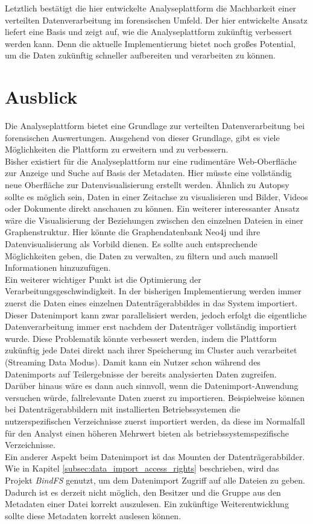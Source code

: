 \noindent
Letztlich bestätigt die hier entwickelte Analyseplattform die Machbarkeit einer verteilten Datenverarbeitung im forensischen Umfeld. Der hier entwickelte Ansatz liefert eine Basis und zeigt auf, wie die Analyseplattform zukünftig verbessert werden kann. Denn die aktuelle Implementierung bietet noch großes Potential, um die Daten zukünftig schneller aufbereiten und verarbeiten zu können.\\

\chapter{Ausblick}
\label{ch:ausblick}

Die Analyseplattform bietet eine Grundlage zur verteilten Datenverarbeitung bei forensischen Auswertungen. Ausgehend von dieser Grundlage, gibt es viele Möglichkeiten die Plattform zu erweitern und zu verbessern.\\
Bisher existiert für die Analyseplattform nur eine rudimentäre Web-Oberfläche zur Anzeige und Suche auf Basis der Metadaten. Hier müsste eine vollständig neue Oberfläche zur Datenvisualisierung erstellt werden. Ähnlich zu Autopsy sollte es möglich sein, Daten in einer Zeitachse zu visualisieren und Bilder, Videos oder Dokumente direkt anschauen zu können. Ein weiterer interessanter Ansatz wäre die Visualisierung der Beziehungen zwischen den einzelnen Dateien in einer Graphenstruktur. Hier könnte die Graphendatenbank Neo4j und ihre Datenvisualisierung als Vorbild dienen. Es sollte auch entsprechende Möglichkeiten geben, die Daten zu verwalten, zu filtern und auch manuell Informationen hinzuzufügen.\\

\noindent
Ein weiterer wichtiger Punkt ist die Optimierung der Verarbeitungsgeschwindigkeit. In der bisherigen Implementierung werden immer zuerst die Daten eines einzelnen Datenträgerabbildes in das System importiert. Dieser Datenimport kann zwar parallelisiert werden, jedoch erfolgt die eigentliche Datenverarbeitung immer erst nachdem der Datenträger vollständig importiert wurde. Diese Problematik könnte verbessert werden, indem die Plattform zukünftig jede Datei direkt nach ihrer Speicherung im Cluster auch verarbeitet (Streaming Data Modus). Damit kann ein Nutzer schon während des Datenimports auf Teilergebnisse der bereits analysierten Daten zugreifen. Darüber hinaus wäre es dann auch sinnvoll, wenn die Datenimport-Anwendung versuchen würde, fallrelevante Daten zuerst zu importieren.
Beispielweise können bei Datenträgerabbildern mit installierten Betriebssystemen die nutzerspezifischen Verzeichnisse zuerst importiert werden, da diese im Normalfall für den Analyst einen höheren Mehrwert bieten als betriebssystemspezifische Verzeichnisse.\\
Ein anderer Aspekt beim Datenimport ist das Mounten der Datenträgerabbilder. Wie in Kapitel \ref{subsec:data_import_access_rights} beschrieben, wird das Projekt \textit{BindFS} genutzt, um dem Datenimport Zugriff auf alle Dateien zu geben. Dadurch ist es derzeit nicht möglich, den Besitzer und die Gruppe aus den Metadaten einer Datei korrekt auszulesen. Ein zukünftige Weiterentwicklung sollte diese Metadaten korrekt auslesen können.\\

